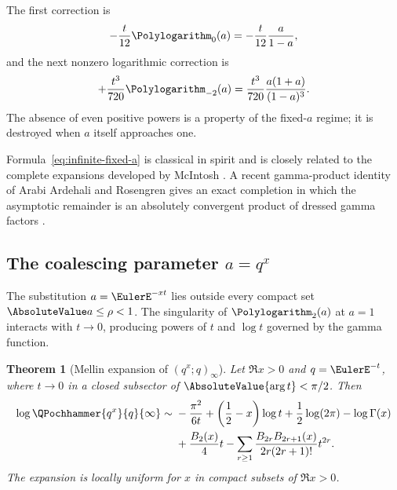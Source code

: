 \documentclass[11pt,oneside]{article}
\newtheorem{theorem}{Theorem}[section]
\theoremstyle{definition}
\theoremstyle{remark}
\let\reportsubsection\subsection
\let\section\reportsubsection
\begin{document}
The first correction is
\[
 -\frac{t}{12}\Polylogarithm_0(a)
 =-\frac{t}{12}\frac{a}{1-a},
\]
and the next nonzero logarithmic correction is
\[
 +\frac{t^3}{720}\Polylogarithm_{-2}(a)
 =\frac{t^3}{720}\frac{a(1+a)}{(1-a)^3}.
\]
The absence of even positive powers is a property of the fixed-$a$ regime; it
is destroyed when $a$ itself approaches one.

Formula~\eqref{eq:infinite-fixed-a} is classical in spirit and is closely
related to the complete expansions developed by McIntosh
\cite{McIntoshShifted}.  A recent gamma-product identity of Arabi Ardehali and
Rosengren gives an exact completion in which the asymptotic remainder is an
absolutely convergent product of dressed gamma factors
\cite{ArdehaliRosengren}.

\section{The coalescing parameter \texorpdfstring{$a=q^x$}{a = q to x}}

The substitution $a=\EulerE^{-xt}$ lies outside every compact set
$\AbsoluteValue a\le\rho<1$.  The singularity of $\Polylogarithm_2(a)$ at $a=1$ interacts with
$t\to0$, producing powers of $t$ and $\log t$ governed by the gamma function.

\begin{theorem}[Mellin expansion of $(q^x;q)_\infty$]
\label{thm:qx-infinite}
Let $\Re x>0$ and $q=\EulerE^{-t}$, where $t\to0$ in a closed subsector of
$\AbsoluteValue{\arg t}<\pi/2$.  Then
\begin{align}
 \log\QPochhammer{q^x}{q}{\infty}
 \sim{}&-\frac{\pi^2}{6t}
 +\left(\frac12-x\right)\log t
 +\frac12\log(2\pi)-\log\Gamma(x)
 \notag\\
 &+\frac{B_2(x)}4t
 -\sum_{r\ge1}
 \frac{B_{2r}B_{2r+1}(x)}{2r(2r+1)!}t^{2r}.
 \label{eq:qx-infinite}
\end{align}
The expansion is locally uniform for $x$ in compact subsets of
$\Re x>0$.
\end{theorem}
\end{document}
